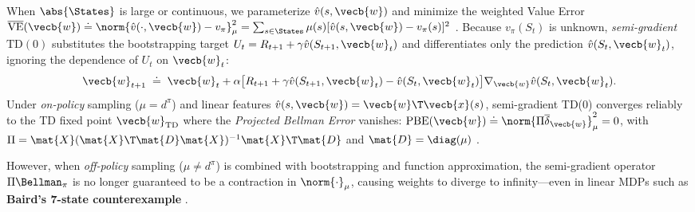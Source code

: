 \documentclass[../../../../master.tex]{subfiles}
\begin{document}
When $\abs{\States}$ is large or continuous, we parameterize $\hat{v}(s, \vecb{w})$ and minimize the weighted Value Error $\overline{\mathrm{VE}}(\vecb{w}) \doteq \norm{\hat{v}(\cdot, \vecb{w}) - v_\pi}_\mu^2 = \sum_{s \in \States} \mu(s) [\hat{v}(s, \vecb{w}) - v_\pi(s)]^2$ . Because $v_\pi(S_t)$ is unknown, \emph{semi-gradient $\mathrm{TD}(0)$} substitutes the bootstrapping target $U_t = R_{t+1} + \gamma \hat{v}(S_{t+1}, \vecb{w}_t)$ and differentiates only the prediction $\hat{v}(S_t, \vecb{w}_t)$, ignoring the dependence of $U_t$ on $\vecb{w}_t$:
\begin{equation}
  \vecb{w}_{t+1} \;\doteq\; \vecb{w}_t + \alpha \bigl[ R_{t+1} + \gamma \hat{v}(S_{t+1}, \vecb{w}_t) - \hat{v}(S_t, \vecb{w}_t) \bigr] \nabla_{\vecb{w}} \hat{v}(S_t, \vecb{w}_t).
  \label{eq:td:semi_grad_td}
\end{equation}
Under \emph{on-policy} sampling ($\mu = d^\pi$) and linear features $\hat{v}(s, \vecb{w}) = \vecb{w}\T \vecb{x}(s)$, semi-gradient TD(0) converges reliably to the TD fixed point $\vecb{w}_{\mathrm{TD}}$ where the \emph{Projected Bellman Error} vanishes: $\mathrm{PBE}(\vecb{w}) \doteq \norm{\Pi \overline{\delta}_{\vecb{w}}}_\mu^2 = 0$, with $\Pi = \mat{X}(\mat{X}\T \mat{D} \mat{X})^{-1} \mat{X}\T \mat{D}$ and $\mat{D} = \diag(\mu)$ .

However, when \emph{off-policy} sampling ($\mu \ne d^\pi$) is combined with bootstrapping and function approximation, the semi-gradient operator $\Pi \Bellman_\pi$ is no longer guaranteed to be a contraction in $\norm{\cdot}_\mu$, causing weights to diverge to infinity---even in linear MDPs such as \textbf{Baird's 7-state counterexample}  .

\end{document}
